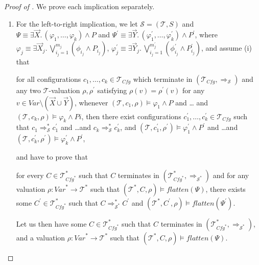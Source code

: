 \documentclass{article}
\newcommand{\Var}{\mathit{Var}}
\newcommand{\Tcfg}{\mathcal{T}_{\mathit{Cfg}}}
\newenvironment{proofenv}
  {
    \VerbatimEnvironment\begin{tcolorbox}[colback=black!0!white] %
  }
  {
   \end{tcolorbox}
  }
\begin{document}
\begin{proof}[Proof of ]
We prove each implication separately.
\begin{enumerate}
    \item For the left-to-right implication, we
    let $\mathcal{S} = (\mathcal{T}, S)$
    and $\Psi \equiv  \exists \vec{X}.\, (\varphi_1,\ldots,\varphi_k) \land P$
    and $\Psi^\prime \equiv \exists \vec{Y}.\, (\varphi_1^\prime,\ldots,\varphi_k^\prime) \land P^\prime$,
    where $\varphi_j \equiv \exists \vec{X}_j.\, \bigvee_{i_j = 1}^{m_j} (\phi_{i_j} \land P_{i_j})$,
    $\varphi^\prime_j \equiv \exists \vec{Y}_j.\, \bigvee_{i_j = 1}^{m^\prime_j} (\phi^\prime_{i_j} \land P^\prime_{i_j})$,
    and assume (i) that
    \begin{proofenv}
        for all configurations $c_1,\ldots,c_k \in \Tcfg$
    which terminate in $(\Tcfg, \Rightarrow_{\mathcal{S}})$
    and any two $\mathcal{T}$-valuation $\rho,\rho^\prime$
    satisfying $\rho(v) = \rho^\prime(v)$ for any $v \in \mathit{Var} \setminus (\vec{X} \cup \vec{Y})$,
    whenever $(\mathcal{T}, c_1,\rho) \vDash \varphi_1 \land P$ and \ldots
    and $(\mathcal{T}, c_k,\rho) \vDash \varphi_k \land Pi$,
    then there exist configurations $c_1^\prime,\ldots,c_k^\prime \in \Tcfg$
    such that $c_1 \Rightarrow^{*}_{\mathcal{S}} c_1^\prime$  
    and \ldots and $c_k \Rightarrow^{*}_{\mathcal{S}} c_k^\prime$,
    and
    $(\mathcal{T}, c_1^\prime,\rho^\prime) \vDash \varphi_1^\prime \land P^\prime$ and \ldots and $(\mathcal{T}, c_k^\prime, \rho^\prime) \vDash \varphi_k^\prime \land P^\prime$,
    \end{proofenv}
    and have to prove that
    \begin{proofenv}
    for every $C \in \mathcal{T}^*_{\mathit{Cfg}^*}$
    such that $C$ terminates in $(\mathcal{T}^*_{\mathit{Cfg}^*}, \Rightarrow_{\mathcal{S}^*})$
    and for any valuation $\rho : \Var^* \to \mathcal{T}^*$
    such that $(\mathcal{T}^*, C, \rho) \vDash \mathit{flatten}(\Psi)$,
    there exists some $C^\prime \in \mathcal{T}^*_{\mathit{Cfg}^*}$
    such that
    $C \Rightarrow^{*}_{\mathcal{S}^*} C^\prime$
    and $(\mathcal{T}^*, C^\prime, \rho) \vDash \mathit{flatten}(\Psi^\prime)$.
    \end{proofenv}
    Let us then have some $C \in \mathcal{T}^*_{\mathit{Cfg}^*}$
    such that $C$ terminates in $(\mathcal{T}^*_{\mathit{Cfg}^*}, \Rightarrow_{\mathcal{S}^*})$,
    and a valuation $\rho : \Var^* \to \mathcal{T}^*$
    such that $(\mathcal{T}^*, C, \rho) \vDash \mathit{flatten}(\Psi)$.

\end{enumerate}
\end{proof}
\end{document}

